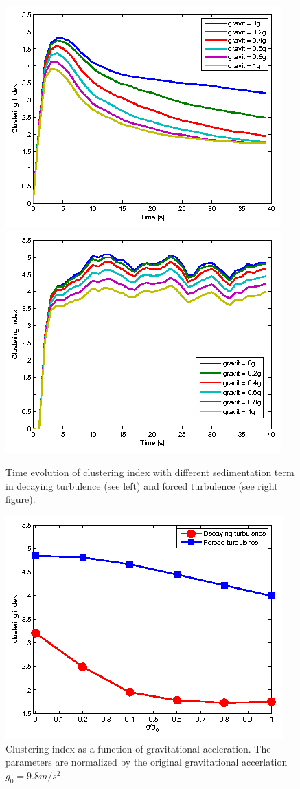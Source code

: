 \begin{figure}[!htbp]\centering
\includegraphics[width=0.45\linewidth]{Figures/gravity_time_decay}
\includegraphics[width=0.45\linewidth]{Figures/gravity_time_force}
\caption{Time evolution of clustering index with different sedimentation term in decaying turbulence (see left) and 
forced turbulence (see right figure).}
\label{fig:gravity_cluster}
\end{figure}

\begin{figure}[!htbp]\centering
\includegraphics[width=0.6\linewidth]{Figures/sedwithgravity}
\caption{Clustering index as a function of gravitational accleration. The parameters are normalized by the original gravitational accerlation $g_0 = 9.8m/s^2$.}\label{fig:sed_gravity}
\end{figure}

